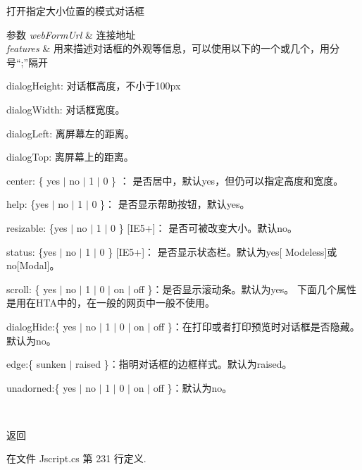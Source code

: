 打开指定大小位置的模式对话框 


\begin{DoxyParams}{参数}
{\em web\-Form\-Url} & 连接地址\\
\hline
{\em features} & 用来描述对话框的外观等信息，可以使用以下的一个或几个，用分号“;”隔开
\begin{DoxyEnumerate}
\item dialog\-Height\-: 对话框高度，不小于100px
\item dialog\-Width\-: 对话框宽度。
\item dialog\-Left\-: 离屏幕左的距离。
\item dialog\-Top\-: 离屏幕上的距离。
\item center\-: \{ yes $|$ no $|$ 1 $|$ 0 \} ： 是否居中，默认yes，但仍可以指定高度和宽度。
\item help\-: \{yes $|$ no $|$ 1 $|$ 0 \}： 是否显示帮助按钮，默认yes。
\item resizable\-: \{yes $|$ no $|$ 1 $|$ 0 \} \mbox{[}I\-E5+\mbox{]}： 是否可被改变大小。默认no。
\item status\-: \{yes $|$ no $|$ 1 $|$ 0 \} \mbox{[}I\-E5+\mbox{]}： 是否显示状态栏。默认为yes\mbox{[} Modeless\mbox{]}或no\mbox{[}Modal\mbox{]}。
\item scroll\-: \{ yes $|$ no $|$ 1 $|$ 0 $|$ on $|$ off \}：是否显示滚动条。默认为yes。 下面几个属性是用在\-H\-T\-A中的，在一般的网页中一般不使用。
\item dialog\-Hide\-:\{ yes $|$ no $|$ 1 $|$ 0 $|$ on $|$ off \}：在打印或者打印预览时对话框是否隐藏。默认为no。
\item edge\-:\{ sunken $|$ raised \}：指明对话框的边框样式。默认为raised。
\item unadorned\-:\{ yes $|$ no $|$ 1 $|$ 0 $|$ on $|$ off \}：默认为no。 
\end{DoxyEnumerate}\\
\hline
\end{DoxyParams}
\begin{DoxyReturn}{返回}

\end{DoxyReturn}


在文件 Jscript.\-cs 第 231 行定义.

